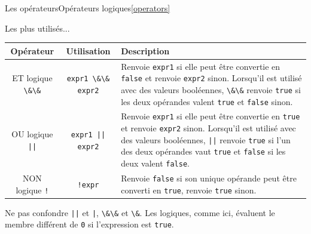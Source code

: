 \documentclass{beamer}
\begin{document}
    \begin{frame}{Les opérateurs}{Opérateurs logiques\cref{operators}}
        \begin{scriptsize}
            Les plus utilisés...
            \begin{table}[h!]
                \centering
                \begin{tabular}{|c|c|p{7cm}|}
                    \hline
                    \textbf{Opérateur}          & \textbf{Utilisation}         & \textbf{Description}                                                                                                                                                                                                                                                                                                 \\
                    \hline
                    ET logique \lstinline{\&\&} & \lstinline{expr1 \&\& expr2} & Renvoie \lstinline{expr1} si elle peut être convertie en \lstinline{false} et renvoie \lstinline{expr2} sinon. Lorsqu'il est utilisé avec des valeurs booléennes, \lstinline{\&\&} renvoie \lstinline{true} si les deux opérandes valent \lstinline{true} et \lstinline{false} sinon.                                \\
                    \hline
                    OU logique \lstinline{||}   & \lstinline{expr1 || expr2}   & Renvoie \lstinline{expr1} si elle peut être convertie en \lstinline{true} et renvoie \lstinline{expr2} sinon. Lorsqu'il est utilisé avec des valeurs booléennes, \lstinline{||} renvoie \lstinline{true} si l'un des deux opérandes vaut \lstinline{true} et \lstinline{false} si les deux valent \lstinline{false}. \\
                    \hline
                    NON logique \lstinline{!}   & \lstinline{!expr}            & Renvoie \lstinline{false} si son unique opérande peut être converti en \lstinline{true}, renvoie \lstinline{true} sinon.                                                                                                                                                                                             \\
                    \hline
                \end{tabular}
            \end{table}
            \begin{dangercolorbox}
                Ne pas confondre \lstinline{||} et \lstinline{|}, \lstinline{\&\&} et \lstinline{\&}.
                Les logiques, comme ici, évaluent le membre différent de \lstinline{0} si l'expression est \lstinline{true}.
            \end{dangercolorbox}
        \end{scriptsize}
    \end{frame}
\end{document}
